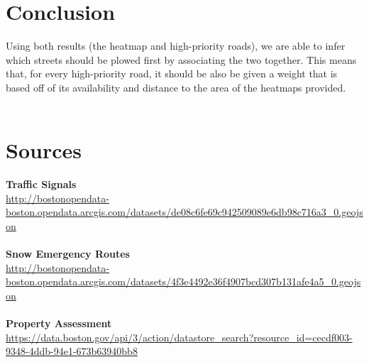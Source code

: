 \documentclass[15pt]{report}
\begin{document}
\section*{Conclusion}
Using both results (the heatmap and high-priority roads), we are able to infer which streets should be plowed first by associating the two together. This means that, for every high-priority road, it should be also be given a weight that is based off of its availability and distance to the area of the heatmaps provided. \\\\
\section*{Sources}
\sloppy 
\textbf{Traffic Signals} \\
\url{http://bostonopendata-boston.opendata.arcgis.com/datasets/de08c6fe69c942509089e6db98c716a3_0.geojson} \\\\
\textbf{Snow Emergency Routes} \\
\url{http://bostonopendata-boston.opendata.arcgis.com/datasets/4f3e4492e36f4907bcd307b131afe4a5_0.geojson} \\\\
\textbf{Property Assessment} \\
\url{https://data.boston.gov/api/3/action/datastore_search?resource_id=cecdf003-9348-4ddb-94e1-673b63940bb8}
\end{document}
